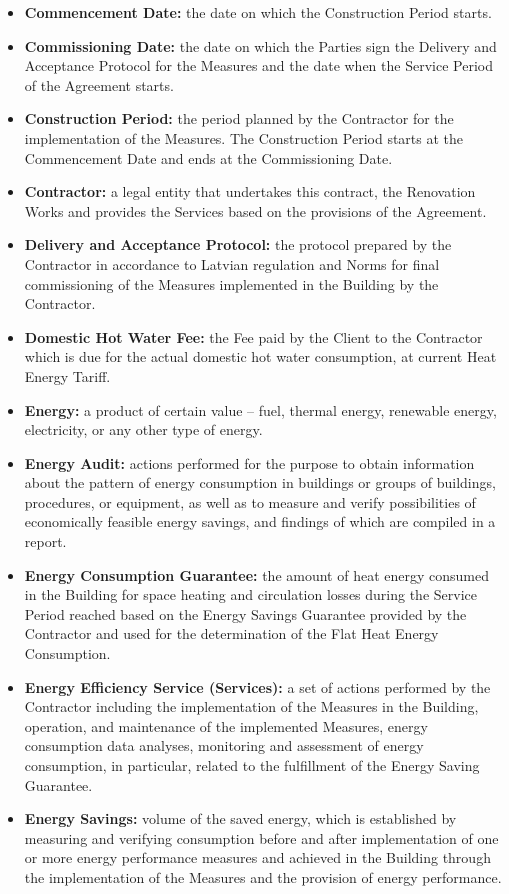 \begin{multicols}{2}
\begin{itemize}[label={}]
	\item\textbf{Commencement Date:} the date on which the Construction Period starts.
	\item\textbf{Commissioning Date:} the date on which the Parties sign the Delivery and Acceptance Protocol for the Measures and the date when the Service Period of the Agreement starts.
	\item\textbf{Construction Period:} the period planned by the Contractor for the implementation of the Measures. The Construction Period starts at the Commencement Date and ends at the Commissioning Date.
	\item\textbf{Contractor:} a legal entity that undertakes this contract, the Renovation Works and provides the Services based on the provisions of the Agreement.
	\item\textbf{Delivery and Acceptance Protocol:} the protocol prepared by the Contractor in accordance to Latvian regulation and Norms for final commissioning of the Measures implemented in the Building by the Contractor.
	\item\textbf{Domestic Hot Water Fee:} the Fee paid by the Client to the Contractor which is due for the actual domestic hot water consumption, at current Heat Energy Tariff.
	\item\textbf{Energy:} a product of certain value – fuel, thermal energy, renewable energy, electricity, or any other type of energy.
	\item\textbf{Energy Audit:} actions performed for the purpose to obtain information about the pattern of energy consumption in buildings or groups of buildings, procedures, or equipment, as well as to measure and verify possibilities of economically feasible energy savings, and findings of which are compiled in a report.
	\item\textbf{Energy Consumption Guarantee:} the amount of heat energy consumed in the Building for space heating and circulation losses during the Service Period reached based on the Energy Savings Guarantee provided by the Contractor and used for the determination of the Flat Heat Energy Consumption.
	\item\textbf{Energy Efficiency Service (Services):} a set of actions performed by the Contractor including the implementation of the Measures in the Building, operation, and maintenance of the implemented Measures, energy consumption data analyses, monitoring and assessment of energy consumption, in particular, related to the fulfillment of the Energy Saving Guarantee.
	\item\textbf{Energy Savings:} volume of the saved energy, which is established by measuring and verifying consumption before and after implementation of one or more energy performance measures and achieved in the Building through the implementation of the Measures and the provision of energy performance.

\end{itemize}
\end{multicols}
